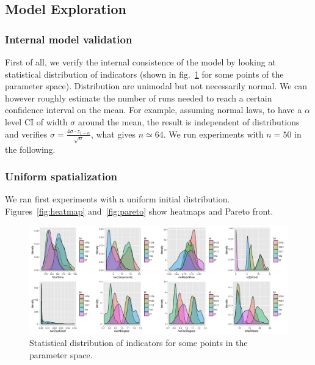 \documentclass{article}
\begin{document}
{%
\subsection{Model Exploration}

\subsubsection{Internal model validation}

First of all, we verify the internal consistence of the model by looking at statistical distribution of indicators (shown in fig.~\ref{fig:stat-distrib} for some points of the parameter space). Distribution are unimodal but not necessarily normal. We can however roughly estimate the number of runs needed to reach a certain confidence interval on the mean. For example, assuming normal laws, to have a $\alpha$ level CI of width $\sigma$ around the mean, the result is independent of distributions and verifies $\sigma = \frac{4\sigma \cdot z_{1-\alpha}}{\sqrt{n}}$, what gives $n\simeq 64$. We run experiments with $n=50$ in the following.


\subsubsection{Uniform spatialization}

We ran first experiments with a uniform initial distribution. Figures~\ref{fig:heatmap} and~\ref{fig:pareto} show heatmaps and Pareto front.





\begin{figure}
\hspace{-2cm}\includegraphics[width=1.3\textwidth]{figures/indics_distrib.png}
\caption{Statistical distribution of indicators for some points in the parameter space.}
\label{fig:stat-distrib}
\end{figure}

}
\end{document}

